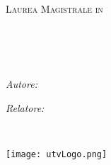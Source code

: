 \documentclass[
12pt,           %
oneside,       %
italian,
headsepline,    %
]{MastersDoctoralThesis} %
\author{Andrea Di Iorio} %
\begin{document}
\begin{titlepage}
	\begin{center}
	\vspace*{.06\textheight}
	{\scshape\LARGE \univname\par}\vspace{1.5cm} %
	\textsc{\Large Laurea Magistrale in \\ \degreename}\\[0.5cm] %
	
	\HRule \\[0.4cm] %
	{\huge \bfseries \ttitle\par}\vspace{0.4cm} %
	\HRule \\[1.5cm] %
	 
	\begin{minipage}[t]{0.4\textwidth}
	\begin{flushleft} \large
	\emph{Autore: \authorname}\\
	\end{flushleft}
	
	\end{minipage}
	\begin{minipage}[t]{0.4\textwidth}
	\begin{flushright} \large
	\emph{Relatore: \supname}\\
	\end{flushright}
	\end{minipage}\\[3cm]
	 
	\vfill
	
	\vfill
	
	\texttt{[image: utvLogo.png]}
	\vfill
	\end{center}
\end{titlepage}
\end{document}
